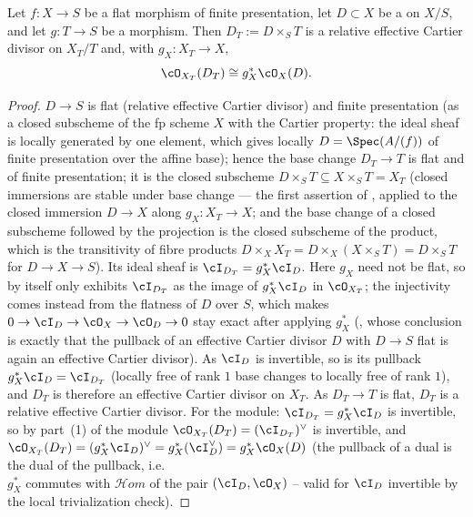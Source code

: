 \begin{lemma}
\label{lem:pc-recd-pullback}
Let $f:X\to S$ be a flat morphism of finite presentation, let
$D\subset X$ be a
 on $X/S$, and let $g:T\to S$ be a morphism.  Then
$D_T:=D\times_ST$ is a relative effective Cartier divisor on $X_T/T$
and, with $g_X:X_T\to X$,
\[
\cO_{X_T}(D_T)\cong g_X^*\cO_X(D).
\]
\end{lemma}
\begin{proof}
$D\to S$ is flat (relative effective Cartier divisor) and finite
presentation (as a closed subscheme of the fp scheme $X$ with the
Cartier property: the ideal sheaf is locally generated by one element,
which gives locally $D=\Spec(A/(f))$ of finite presentation over the
affine base); hence the base change $D_T\to T$ is flat and of finite
presentation; it is the closed subscheme $D\times_ST\subseteq
X\times_ST=X_T$ (closed immersions are stable under base change --- the
first assertion of , applied to the
closed immersion $D\to X$ along $g_X:X_T\to X$; and the base change of a
closed subscheme followed by the projection is the closed subscheme of
the product, which is the transitivity of fibre products
$D\times_XX_T=D\times_X(X\times_ST)=D\times_ST$ for $D\to X\to S$).
Its ideal sheaf is
$\cI_{D_T}=g_X^*\cI_D$.  Here $g_X$ need not be flat, so
 by itself only exhibits
$\cI_{D_T}$ as the image of $g_X^*\cI_D$ in $\cO_{X_T}$; the
injectivity comes instead from the flatness of $D$ over $S$, which
makes $0\to\cI_D\to\cO_X\to\cO_D\to0$ stay exact after applying
$g_X^*$ (, whose conclusion
is exactly that the pullback of an effective Cartier divisor $D$ with
$D\to S$ flat is again an effective Cartier divisor).  As $\cI_D$ is
invertible, so is its pullback $g_X^*\cI_D=\cI_{D_T}$ (locally free of rank $1$ base changes
to locally free of rank $1$), and $D_T$ is therefore an effective
Cartier divisor on $X_T$.  As $D_T\to T$ is flat, $D_T$ is a relative
effective Cartier divisor.  For the module: $\cI_{D_T}=g_X^*\cI_D$ is
invertible, so by part~(1) of
 the module
$\cO_{X_T}(D_T)=(\cI_{D_T})^\vee$ is invertible, and
$\cO_{X_T}(D_T)=(g_X^*\cI_D)^\vee=g_X^*(\cI_D^\vee)=g_X^*\cO_X(D)$
(the pullback of a dual is the dual of the pullback, i.e.\\
$g_X^*$ commutes with $\mathcal{H}om$ of the pair $(\cI_D,\cO_X)$ --
valid for $\cI_D$ invertible by the local trivialization check).
\end{proof}

